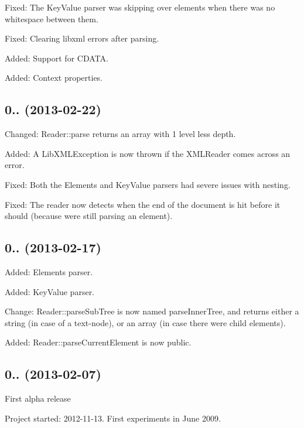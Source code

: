 \begin{DoxyItemize}
\item Fixed\+: The Key\+Value parser was skipping over elements when there was no whitespace between them.
\item Fixed\+: Clearing libxml errors after parsing.
\item Added\+: Support for C\+D\+A\+TA.
\item Added\+: Context properties.
\end{DoxyItemize}

\subsection*{0.. (2013-\/02-\/22) }


\begin{DoxyItemize}
\item Changed\+: Reader\+::parse returns an array with 1 level less depth.
\item Added\+: A Lib\+X\+M\+L\+Exception is now thrown if the X\+M\+L\+Reader comes across an error.
\item Fixed\+: Both the Elements and Key\+Value parsers had severe issues with nesting.
\item Fixed\+: The reader now detects when the end of the document is hit before it should (because we\textquotesingle{}re still parsing an element).
\end{DoxyItemize}

\subsection*{0.. (2013-\/02-\/17) }


\begin{DoxyItemize}
\item Added\+: Elements parser.
\item Added\+: Key\+Value parser.
\item Change\+: Reader\+::parse\+Sub\+Tree is now named parse\+Inner\+Tree, and returns either a string (in case of a text-\/node), or an array (in case there were child elements).
\item Added\+: Reader\+::parse\+Current\+Element is now public.
\end{DoxyItemize}

\subsection*{0.. (2013-\/02-\/07) }


\begin{DoxyItemize}
\item First alpha release
\end{DoxyItemize}

Project started\+: 2012-\/11-\/13. First experiments in June 2009. 